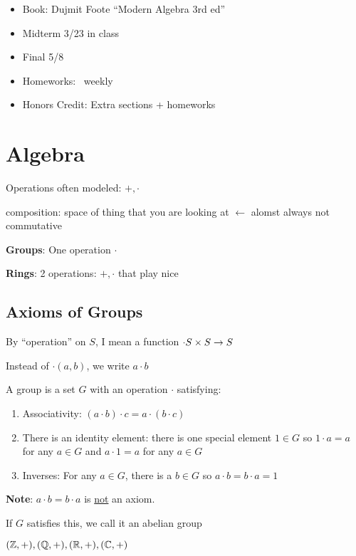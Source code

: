 
\begin{itemize}
  \item Book: Dujmit Foote ``Modern Algebra 3rd ed''
  \item Midterm 3/23 in class
  \item Final 5/8
  \item Homeworks: ~weekly
  \item Honors Credit: Extra sections + homeworks
\end{itemize}


\chapter{Algebra}
Operations often modeled:
$+, \cdot$

composition: space of thing that you are looking at $\leftarrow$ alomst always not commutative

\textbf{Groups}: One operation $\cdot$

\textbf{Rings}: 2 operations: $+, \cdot$ that play nice


\section{Axioms of Groups}

By ``operation'' on $S$, I mean a function $\cdot S \times S \rightarrow S$

Instead of $\cdot(a, b)$, we write $a \cdot b$

A group is a set $G$ with an operation $\cdot$ satisfying:
\begin{enumerate}
  \item Associativity: $(a \cdot b) \cdot c = a \cdot (b \cdot c)$
  \item There is an identity element: there is one special element $1 \in G$ so $1 \cdot a  = a$ for any $a \in G$
  and $a \cdot 1 = a$ for any $a \in G$
  \item Inverses: For any $a \in G$, there is a $b \in G$ so $a \cdot b = b \cdot a = 1$

\end{enumerate}

\textbf{Note}: $a \cdot b = b\cdot a$ is \underline{not} an axiom.

If $G$ satisfies this, we call it an abelian group

\begin{example*}
  $(\mathbb Z, +), (\mathbb Q, +), (\mathbb R, +), (\mathbb C, +)$
\end{example*}

